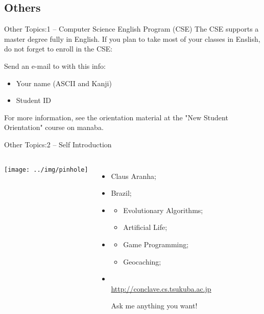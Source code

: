 \documentclass{beamer}
\begin{document}
\begin{CJK}{UTF8}{ipxm}
\section{Others}
\begin{frame}{Other Topics:}{1 -- Computer Science English Program (CSE)}
  The CSE supports a master degree fully in English. If you plan to take most of your classes in Enslish, do not forget to enroll in the CSE:
  \bigskip

  Send an e-mail to  with this info:
  \begin{itemize}
    \item Your name (ASCII and Kanji)
    \item Student ID
  \end{itemize}

  For more information, see the orientation material at the "New Student Orientation" course on manaba.
\end{frame}

\begin{frame}{Other Topics:}{2 -- Self Introduction}
  \begin{columns}
    \texttt{[image: ../img/pinhole]}
    {\small
    \begin{itemize}
      \item {} Claus Aranha;
      \item {} Brazil;
      \item {}
      \begin{itemize}
        \item Evolutionary Algorithms;
        \item Artificial Life;
      \end{itemize}
      \item {}
      \begin{itemize}
        \item Game Programming;
        \item Geocaching;
      \end{itemize}
        \medskip

      \item {}\\
      {\smaller \url{http://conclave.cs.tsukuba.ac.jp}}
      \medskip

      Ask me anything you want!      
    \end{itemize}
    }
  \end{columns}
\end{frame}


\end{CJK}
\end{document}
